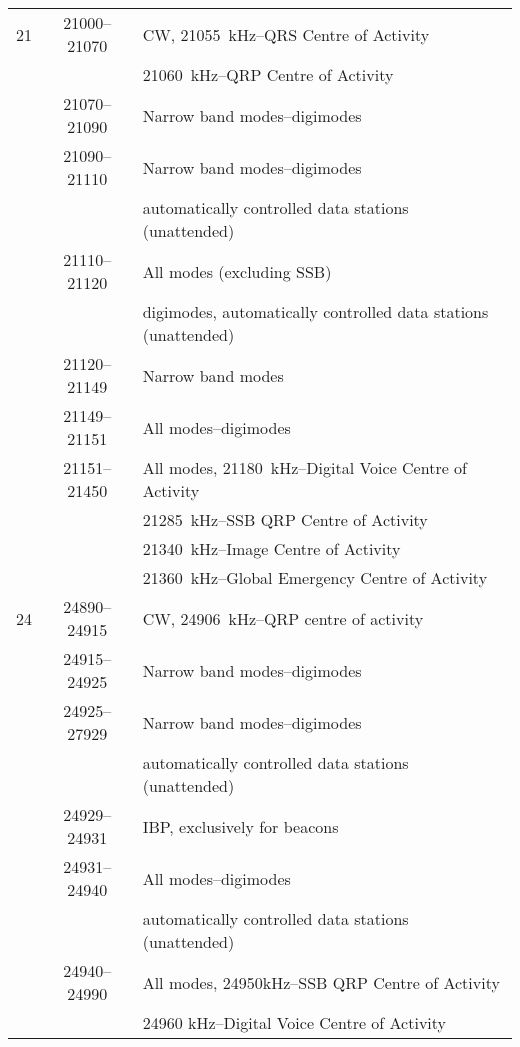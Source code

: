 \begin{longtable}{lcl}
21   & 21000--21070 & CW, 21055~kHz--QRS Centre of Activity\\
 & & 21060~kHz--QRP Centre of Activity\\
 & 21070--21090 & Narrow band modes--digimodes\\
     & 21090--21110 & Narrow band modes--digimodes\\
     & & automatically controlled data stations (unattended)\\
     & 21110--21120 & All modes (excluding SSB)\\
     & & digimodes, automatically controlled data stations (unattended)\\
     & 21120--21149 & Narrow band modes\\
     & 21149--21151 & All modes--digimodes\\
     & 21151--21450 & All modes, 21180~kHz--Digital Voice Centre of Activity \\
     & & 21285~kHz--SSB QRP Centre of Activity\\
     & & 21340~kHz--Image Centre of Activity\\
     & & 21360~kHz--Global Emergency Centre of Activity\\

24   & 24890--24915 & CW, 24906~kHz--QRP centre of activity\\
     & 24915--24925 & Narrow band modes--digimodes\\
     & 24925--27929 & Narrow band modes--digimodes\\
     & & automatically controlled data stations (unattended)\\
     & 24929--24931 & IBP, exclusively for beacons\\
     & 24931--24940 & All modes--digimodes\\
     & & automatically controlled data stations (unattended)\\
     & 24940--24990 & All modes, 24950kHz--SSB QRP Centre of Activity\\
     & & 24960 kHz--Digital Voice Centre of Activity\\


\end{longtable}
